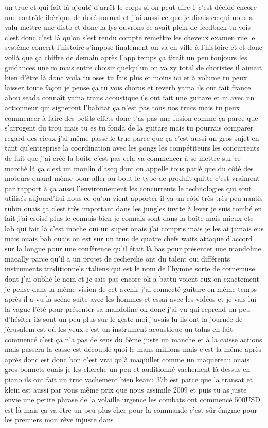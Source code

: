  un truc et qui fait là ajouté d'arrêt le corps si on peut dire 1 c'est décidé encore une contrôle ibérique de doré normal et j'ai aussi ce que je disais ce qui nous a valu mettre une disto et donc la lys ouvrons ce avait plein de feedback tu vois c'est donc c'est là qu'on s'est rendu compte remettre les cheveux examen rue le système concert l'histoire s'impose finalement on va en ville à l'histoire et et donc voilà que ça chiffre de demain après l'app temps ça tirait un peu toujours les guidances une m mais entre choisir quelqu'un on va zy total de choristes il aimait bien d'être là donc voila tu oses tu fais plus et moins ici et à volume tu peux laisser toute façon je pense ça tu vois chorus et reverb yama ils ont fait france abou seada connaît yama trans acoustique ils ont fait une guitare et m avec un actionneur qui signeront l'habitat ça n'est pas tous nos trucs mais tu peux commencer à faire des petits effets donc t'as pas une fusion comme ça parce que s'arrogent du trou mais tu es tu fonda de la guitare mais tu pourrais comparer regard des cieux j'ai même passé le truc parce que ça c'est aussi un gros sujet en tant qu'entreprise la coordination avec les gongs les compétiteurs les concurrents de fait que j'ai créé la boîte c'est pas cela va commencer à se mettre sur ce marché là ça c'est un moulin d'ascq dont on appelle tous parlé que du côté des moteurs quand même pour aller au bout le type de produit quitte c'est vraiment par rapport à ça aussi l'environnement les concurrents le technologies qui sont utilisés aujourd'hui nous ce qu'on vient apporter il ya un côté très très peu nantis rubin ouais ça c'est très important dans les jungles invite à lever je suis tombé en fait j'ai croisé plus le connais bien je connais sont dans la boîte mais mieux etc lab qui fait là c'est moche oui un super ouais j'ai compris mais je les ai jamais eus mais ouais bah ouais on est sur un truc de quatre chefs waits attaque d'accord sur la longue pour une conférence qu'il était là bas pour présenter une mandoline macally parce qu'il a un projet de recherche ont du talent oui différents instruments traditionnels italiens qui est le nom de l'hymne sorte de cornemuse dont j'ai oublié le nom et je sais pas encore ok a battu voient eux on exactement je pense dans la même vision de cet avenir j'ai connecté guitare en même temps après il a vu la scène suite avec les hommes et essai avec les vidéos et je vais lui la vague l'été pour présenter sa mandoline ok donc j'ai vu qui reprend un peu d'hésiter ils sont un peu plus sur le geste moi j'avais lu ils ont la journée de jérusalem est où les yeux c'est un instrument acoustique un talus en fait commencé c'est ça n'a pas de sens du 6ème juste un manche et à la caisse actions mais passera la casse est découplé quoi le mans millions mais c'est la même après après donc est donc bon c'est vrai qu'à maquiller comme un maquereau ouais gros bonnets ouais je les cherche un peu et auditionné vachement là dessus en piano ils ont fait un truc vachement bien keanu 37b est parce que la transat et klein est aussi par vous même prix que nous assimile 2009 et puis tu as juste envie une petite phrase de la volaille urgence les combats ont commencé 500USD est là mais ça va être un peu plus cher pour la commande c'est sûr énigme pour les premiers mon rêve injuste dans 